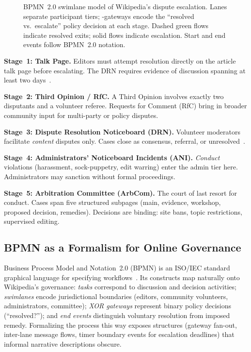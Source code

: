 \documentclass[conference]{IEEEtran}
\begin{document}
\begin{figure}[tb]
\caption{BPMN~2.0 swimlane model of Wikipedia's dispute escalation.
  Lanes separate participant tiers; \texttimes-gateways encode the
  ``resolved vs.~escalate'' policy decision at each stage.
  Dashed green flows indicate resolved exits; solid flows indicate
  escalation. Start and end events follow BPMN~2.0 notation.}
\label{fig:bpmn}
\end{figure}

\noindent\textbf{Stage~1: Talk Page.} Editors must attempt resolution
directly on the article talk page before escalating. The DRN requires evidence
of discussion spanning at least two days~\cite{b_wp_drn}.

\noindent\textbf{Stage~2: Third Opinion / RfC.} A Third Opinion involves
exactly two disputants and a volunteer referee. Requests for Comment (RfC)
bring in broader community input for multi-party or policy disputes.

\noindent\textbf{Stage~3: Dispute Resolution Noticeboard (DRN).}
Volunteer moderators facilitate \emph{content} disputes only. Cases close as
consensus, referral, or unresolved~\cite{b_wp_drn}.

\noindent\textbf{Stage~4: Administrators' Noticeboard Incidents (ANI).}
\emph{Conduct} violations (harassment, sock-puppetry, edit warring) enter the
admin tier here. Administrators may sanction without formal proceedings.

\noindent\textbf{Stage~5: Arbitration Committee (ArbCom).}
The court of last resort for conduct. Cases span five structured subpages
(main, evidence, workshop, proposed decision, remedies). Decisions are
binding: site bans, topic restrictions, supervised editing.

\subsection{BPMN as a Formalism for Online Governance}

Business Process Model and Notation~2.0 (BPMN) is an ISO/IEC standard
graphical language for specifying workflows~\cite{b_bpmn}. Its constructs
map naturally onto Wikipedia's governance: \emph{tasks} correspond to
discussion and decision activities; \emph{swimlanes} encode jurisdictional
boundaries (editors, community volunteers, administrators, committee);
\emph{XOR gateways} represent binary policy decisions (``resolved?'');
and \emph{end events} distinguish voluntary resolution from imposed remedy.
Formalizing the process this way exposes structures (gateway fan-out,
inter-lane message flows, timer boundary events for escalation
deadlines) that informal narrative descriptions obscure.
\end{document}
